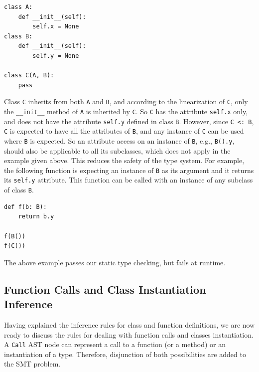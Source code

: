 \begin{lstlisting}
class A:
	def __init__(self):
		self.x = None
class B:
	def __init__(self):
		self.y = None

class C(A, B):
	pass
\end{lstlisting}
Class \lstinline|C| inherits from both \lstinline|A| and \lstinline|B|, and according to the linearization of \lstinline|C|, only the \lstinline|__init__| method of \lstinline|A| is inherited by \lstinline|C|. So \lstinline|C| has the attribute \lstinline|self.x| only, and does not have the attribute \lstinline|self.y| defined in class \lstinline|B|. However, since \lstinline|C <: B|, \lstinline|C| is expected to have all the attributes of \lstinline|B|, and any instance of \lstinline|C| can be used where \lstinline|B| is expected. So an attribute access on an instance of \lstinline|B|, e.g., \lstinline|B().y|, should also be applicable to all its subclasses, which does not apply in the example given above. This reduces the safety of the type system. For example, the following function is expecting an instance of \lstinline|B| as its argument and it returns its \lstinline|self.y| attribute. This function can be called with an instance of any subclass of class \lstinline|B|.
\begin{lstlisting}
def f(b: B):
	return b.y
	
f(B())
f(C()) 
\end{lstlisting}
The above example passes our static type checking, but fails at runtime.
\subsection{Function Calls and Class Instantiation Inference}\label{sec:call}
Having explained the inference rules for class and function definitions, we are now ready to discuss the rules for dealing with function calls and classes instantiation. A \lstinline|Call| AST node can represent a call to a function (or a method) or an instantiation of a type. Therefore, disjunction of both possibilities are added to the SMT problem.

